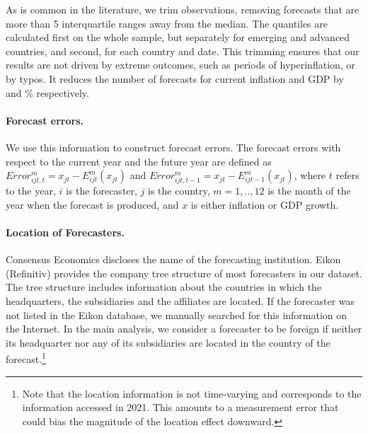 As is common in the literature, we trim observations, removing forecasts that are more than 5 interquartile ranges away from the median. The quantiles are calculated first on the whole sample, but separately for emerging and advanced countries, and second, for each country and date. This trimming ensures that our results are not driven by extreme outcomes, such as periods of hyperinflation, or by typos. It reduces the number of forecasts for current inflation and GDP by  and  \% respectively.%

\paragraph{Forecast errors.} We use this information to construct forecast errors. The forecast errors with respect to the current year and the future year are defined as
$Error_{ijt,t}^m=x_{jt}-E_{ijt}^m(x_{jt})$ and $Error_{ijt,t-1}^m=x_{jt}-E_{ijt-1}^m(x_{jt})$, 
where $t$ refers to the year, $i$ is the forecaster, $j$ is the country, $m=1,..,12$ is the month of the year when the forecast is produced, and $x$ is either inflation or GDP growth.

\paragraph{Location of Forecasters.} Consensus Economics discloses the name of the forecasting institution. Eikon (Refinitiv) provides the company tree structure of most forecasters in our dataset. The tree structure includes information about the countries in which the headquarters, the subsidiaries and the affiliates are located. If the forecaster was not listed in the Eikon database, we manually searched for this information on the Internet. In the main analysis, we consider a forecaster to be foreign if neither its headquarter nor any of its subsidiaries are located in the country of the forecast.\footnote{Note that the location information is not time-varying and corresponds to the information accessed in 2021. This amounts to a measurement error that could bias the magnitude of the location effect downward.} %


